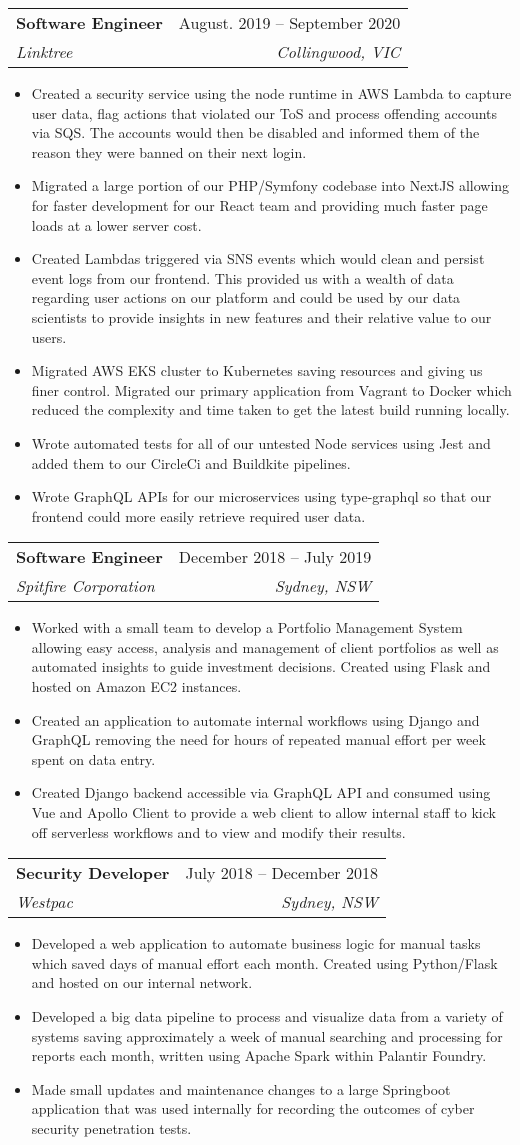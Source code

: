 \documentclass[letterpaper,11pt]{article}
\makeatletter
\newcommand{\resumeItem}[1]{
  \item\small{
    {#1 \vspace{1pt}}
  }
}
\newcommand{\resumeSubheading}[4]{
  \vspace{1pt}\item
    \begin{tabular*}{0.97\textwidth}[t]{l@{\extracolsep{\fill}}r}
      \textbf{#1} & #2 \\
      \textit{\small#3} & \textit{\small #4} \\
    \end{tabular*}\vspace{4pt}
}
\newcommand{\resumeItemListStart}{\begin{itemize}}
\newcommand{\resumeItemListEnd}{\end{itemize}\vspace{-5pt}}
\makeatother
\begin{document}
    \resumeSubheading
      {Software Engineer}{August. 2019 -- September 2020}
      {Linktree}{Collingwood, VIC}
      \resumeItemListStart
        \resumeItem{Created a security service using the node runtime in AWS Lambda to capture user data, flag actions that violated our ToS and process offending accounts via SQS. The accounts would then be disabled and informed them of the reason they were banned on their next login.}
        \resumeItem{Migrated a large portion of our PHP/Symfony codebase into NextJS allowing for faster development for our React team and providing much faster page loads at a lower server cost.}
        \resumeItem{Created Lambdas triggered via SNS events which would clean and persist event logs from our frontend. This provided us with a wealth of data regarding user actions on our platform and could be used by our data scientists to provide insights in new features and their relative value to our users.}
        \resumeItem{Migrated AWS EKS cluster to Kubernetes saving resources and giving us finer control. Migrated our primary application from Vagrant to Docker which reduced the complexity and time taken to get the latest build running locally.}
        \resumeItem{Wrote automated tests for all of our untested Node services using Jest and added them to our CircleCi and Buildkite pipelines.}
        \resumeItem{Wrote GraphQL APIs for our microservices using type-graphql so that our frontend could more easily retrieve required user data.}
    \resumeItemListEnd

    \resumeSubheading
      {Software Engineer}{December 2018 -- July 2019}
      {Spitfire Corporation}{Sydney, NSW}
      \resumeItemListStart
        \resumeItem{Worked with a small team to develop a Portfolio Management System allowing easy access, analysis and management of client portfolios as well as automated insights to guide investment decisions. Created using Flask and hosted on Amazon EC2 instances.}
        \resumeItem{Created an application to automate internal workflows using Django and GraphQL removing the need for hours of repeated manual effort per week spent on data entry.}
        \resumeItem{Created Django backend accessible via GraphQL API and consumed using Vue and Apollo Client to provide a web client to allow internal staff to kick off serverless workflows and to view and modify their results.}
      \resumeItemListEnd
      
    \resumeSubheading
      {Security Developer}{July 2018 -- December 2018}
      {Westpac}{Sydney, NSW}
      \resumeItemListStart
        \resumeItem{Developed a web application to automate business logic for manual tasks which saved days of manual effort each month. Created using Python/Flask and hosted on our internal network.}
        \resumeItem{Developed a big data pipeline to process and visualize data from a variety of systems saving approximately a week of manual searching and processing for reports each month, written using Apache Spark within Palantir Foundry.}
        \resumeItem{Made small updates and maintenance changes to a large Springboot application that was used internally for recording the outcomes of cyber security penetration tests.}
      \resumeItemListEnd
\end{document}
